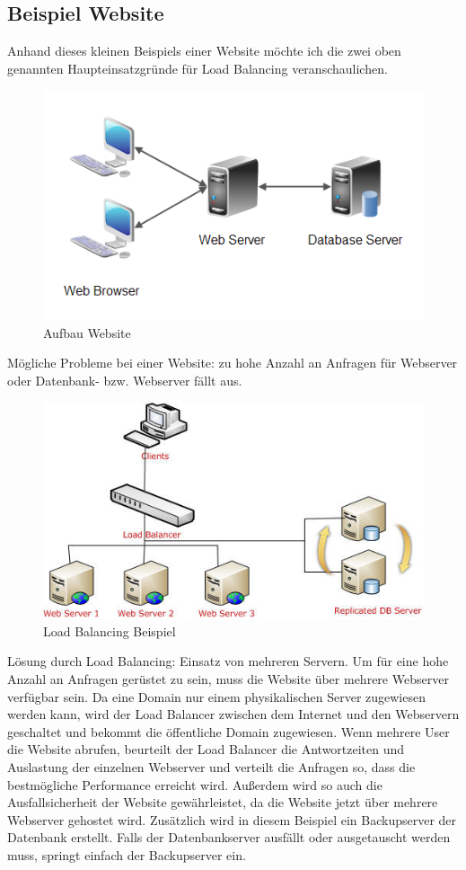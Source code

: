 \pagebreak
\subsection{Beispiel Website}
\label{sec:Beispiel Website}
Anhand dieses kleinen Beispiels einer Website möchte ich die zwei oben genannten Haupteinsatzgründe für Load Balancing veranschaulichen. 
\begin{figure}[!h]
	\begin{center}
		\includegraphics[width=0.4\linewidth]{images/loadbalancing12.jpg}
		\caption{Aufbau Website \cite{LoadBalancingGrafik2}}
		\label{Aufbau Website}
	\end{center}
\end{figure}

Mögliche Probleme bei einer Website: zu hohe Anzahl an Anfragen für Webserver oder Datenbank- bzw. Webserver fällt aus.

\begin{figure}[!h]
	\begin{center}
		\includegraphics[width=0.4\linewidth]{images/loadbalancing1.jpg}
		\caption{Load Balancing Beispiel \cite{LoadBalancingGrafik1}}
		\label{Load Balancing Beispiel}
	\end{center}
\end{figure}

Lösung durch Load Balancing: Einsatz von mehreren Servern. Um für eine hohe Anzahl an Anfragen gerüstet zu sein, muss die Website über mehrere Webserver verfügbar sein. Da eine Domain nur einem physikalischen Server zugewiesen werden kann, wird der Load Balancer zwischen dem Internet und den Webservern geschaltet und bekommt die öffentliche Domain zugewiesen. Wenn mehrere User die Website abrufen, beurteilt der Load Balancer die Antwortzeiten und Auslastung der einzelnen Webserver und verteilt die Anfragen so, dass die bestmögliche Performance erreicht wird. Außerdem wird so auch die Ausfallsicherheit der Website gewährleistet, da die Website jetzt über mehrere Webserver gehostet wird. Zusätzlich wird in diesem Beispiel ein Backupserver der Datenbank erstellt. Falls der Datenbankserver ausfällt oder ausgetauscht werden muss, springt einfach der Backupserver ein.      

